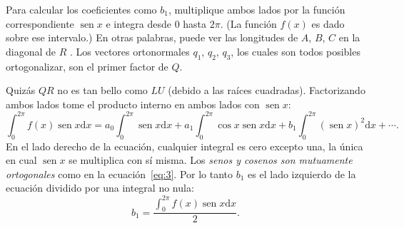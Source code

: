 \documentclass[
	a4paper,
	11pt,
	oneside
]{scrreprt}
\begin{document}
Para calcular los coeficientes como $b_{1}$, multiplique ambos lados por la función correspondiente $\operatorname{sen}x$ e integra desde $0$ hasta $2\pi$. (La función $f\left(x\right)$ es dado sobre ese intervalo.) En otras palabras, puede ver las longitudes de $A$, $B$, $C$ en la diagonal de $R$ . Los vectores ortonormales $q_{1}$, $q_{2}$, $q_{3}$, los cuales son todos posibles ortogonalizar, son el primer factor de $Q$.

Quizás $QR$ no es tan bello como $LU$ (debido a las raíces cuadradas). Factorizando ambos lados tome el producto interno en ambos lados con $\operatorname{sen}x$:
\begin{equation}
\int_{0}^{2\pi}f\left(x\right)\operatorname{sen}x\mathrm{d}x=a_{0}\int_{0}^{2\pi}\operatorname{sen}x\mathrm{d}x+a_{1}\int_{0}^{2\pi}\cos x\operatorname{sen}x\mathrm{d}x+b_{1}\int_{0}^{2\pi}{\left(\operatorname{sen}x\right)}^{2}\mathrm{d}x+\cdots.
\end{equation}
En el lado derecho de la ecuación, cualquier integral es cero excepto una, la única en cual $\operatorname{sen}x$ se multiplica con sí misma. Los \emph{senos y cosenos son mutuamente ortogonales} como en la ecuación~\eqref{eq:3}. Por lo tanto $b_{1}$ es el lado izquierdo de la ecuación dividido por una integral no nula:
\begin{equation}
b_{1}=\frac{\int_{0}^{2\pi}f\left(x\right)\operatorname{sen}x\mathrm{d}x}{2}.
\end{equation}
\end{document}
